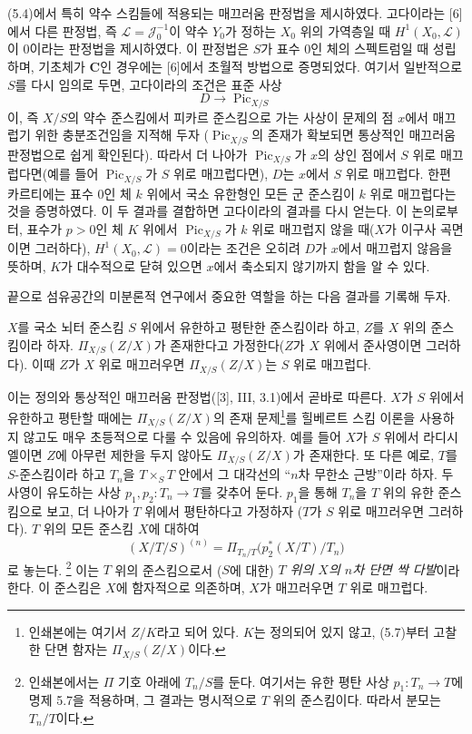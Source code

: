 (5.4)에서 특히 약수 스킴들에 적용되는 매끄러움 판정법을 제시하였다.
고다이라는 [6]에서 다른 판정법, 즉 $\mathcal L=\mathcal J_0^{-1}$이
약수 $Y_0$가 정하는 $X_0$ 위의 가역층일 때
$H^1(X_0,\mathcal L)$이 0이라는 판정법을 제시하였다. 이 판정법은 $S$가
표수 0인 체의 스펙트럼일 때 성립하며, 기초체가 $\mathbf C$인 경우에는
[6]에서 초월적 방법으로 증명되었다. 여기서 일반적으로 $S$를 다시 임의로
두면, 고다이라의 조건은 표준 사상
\[
D\longrightarrow\operatorname{Pic}_{X/S}
\]
이, 즉 $X/S$의 약수 준스킴에서 피카르 준스킴으로 가는 사상이 문제의 점
$x$에서 매끄럽기 위한 충분조건임을 지적해 두자
($\operatorname{Pic}_{X/S}$의 존재가 확보되면 통상적인 매끄러움 판정법으로
쉽게 확인된다). 따라서 더 나아가 $\operatorname{Pic}_{X/S}$가 $x$의 상인
점에서 $S$ 위로 매끄럽다면(예를 들어 $\operatorname{Pic}_{X/S}$가 $S$ 위로
매끄럽다면), $D$는 $x$에서 $S$ 위로 매끄럽다. 한편 카르티에는 표수 0인
체 $k$ 위에서 국소 유한형인 모든 군 준스킴이 $k$ 위로 매끄럽다는 것을
증명하였다. 이 두 결과를 결합하면 고다이라의 결과를 다시 얻는다. 이
논의로부터, 표수가 $p>0$인 체 $K$ 위에서
$\operatorname{Pic}_{X/S}$가 $k$ 위로 매끄럽지 않을 때($X$가 이구사
곡면이면 그러하다), $H^1(X_0,\mathcal L)=0$이라는 조건은 오히려 $D$가
$x$에서 매끄럽지 않음을 뜻하며, $K$가 대수적으로 닫혀 있으면 $x$에서
축소되지 않기까지 함을 알 수 있다.

끝으로 섬유공간의 미분론적 연구에서 중요한 역할을 하는 다음 결과를
기록해 두자.

 $X$를 국소 뇌터 준스킴 $S$ 위에서 유한하고 평탄한
준스킴이라 하고, $Z$를 $X$ 위의 준스킴이라 하자.
$\Pi_{X/S}(Z/X)$가 존재한다고 가정한다($Z$가 $X$ 위에서 준사영이면
그러하다). 이때 $Z$가 $X$ 위로 매끄러우면 $\Pi_{X/S}(Z/X)$는 $S$ 위로
매끄럽다.

이는 정의와 통상적인 매끄러움 판정법([3], III, 3.1)에서 곧바로 따른다.
$X$가 $S$ 위에서 유한하고 평탄할 때에는
$\Pi_{X/S}(Z/X)$의 존재 문제\footnote{인쇄본에는 여기서 $Z/K$라고 되어
있다. $K$는 정의되어 있지 않고, (5.7)부터 고찰한 단면 함자는
$\Pi_{X/S}(Z/X)$이다.}를 힐베르트 스킴 이론을 사용하지 않고도 매우
초등적으로 다룰 수 있음에 유의하자.
예를 들어 $X$가 $S$ 위에서 라디시엘이면 $Z$에 아무런 제한을 두지 않아도
$\Pi_{X/S}(Z/X)$가 존재한다. 또 다른 예로, $T$를 $S$-준스킴이라 하고
$T_n$을 $T\times_ST$ 안에서 그 대각선의 ``$n$차 무한소 근방''이라 하자.
두 사영이 유도하는 사상
$p_1,p_2:T_n\longrightarrow T$를 갖추어 둔다. $p_1$을 통해 $T_n$을 $T$
위의 유한 준스킴으로 보고, 더 나아가 $T$ 위에서 평탄하다고 가정하자
($T$가 $S$ 위로 매끄러우면 그러하다). $T$ 위의 모든 준스킴 $X$에 대하여
\[
(X/T/S)^{(n)}=
\Pi_{T_n/T}\bigl(p_2^*(X/T)/T_n\bigr)
\]
로 놓는다.
\footnote{인쇄본에서는 $\Pi$ 기호 아래에 $T_n/S$를 둔다. 여기서는 유한
평탄 사상 $p_1:T_n\to T$에 명제 5.7을 적용하며, 그 결과는 명시적으로
$T$ 위의 준스킴이다. 따라서 분모는 $T_n/T$이다.}
이는 $T$ 위의 준스킴으로서 ($S$에 대한) \emph{$T$ 위의 $X$의 $n$차
단면 싹 다발}이라 한다. 이 준스킴은 $X$에 함자적으로 의존하며, $X$가
매끄러우면 $T$ 위로 매끄럽다.

